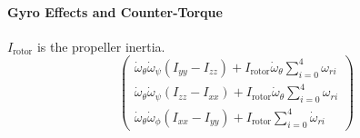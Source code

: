     \paragraph{Gyro Effects and Counter-Torque\newline}
        $I_{\text{rotor}}$ is the propeller inertia.
        \begin{equation}\left(
            \begin{array}{c}
                \dot{\omega}_{\theta}\dot{\omega}_{\psi}(I_{yy}-I_{zz}) + I_{\text{rotor}}\dot{\omega}_{\theta}\sum_{i=0}^{4}\omega_{ri} \\
                \dot{\omega}_{\theta}\dot{\omega}_{\psi}(I_{zz}-I_{xx}) + I_{\text{rotor}}\dot{\omega}_{\theta}\sum_{i=0}^{4}\omega_{ri} \\
                \dot{\omega}_{\theta}\dot{\omega}_{\phi}(I_{xx}-I_{yy}) + I_{\text{rotor}}\sum_{i=0}^{4}\dot{\omega}_{ri}
            \end{array}\right)
        \end{equation}

